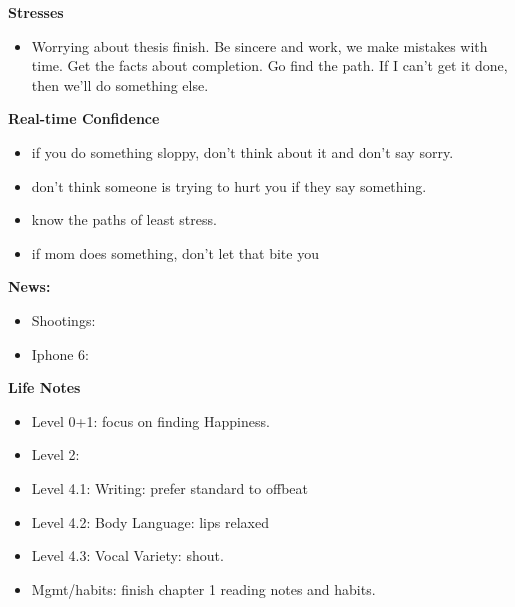 \documentclass[11pt]{article}
\begin{document}
{\textbf{Stresses}\\
\begin{itemize}
  \tiny \item \tiny Worrying about thesis finish. Be sincere and work, we
  make mistakes with time. Get the facts about completion.  Go
  find the path. If I can't get it done, then we'll do something
  else.
\end{itemize}

  \textbf{Real-time Confidence}\\
  \begin{itemize}
    \tiny \item \tiny if you do something sloppy, don't think about it and don't say sorry.
  \item \tiny don't think someone is trying to hurt you if they say something.
  \item \tiny know the paths of least stress.
  \item \tiny if mom does something, don't let that bite you
  \end{itemize}
  
  \textbf{News:} 
  \begin{itemize}
  \item \tiny Shootings: 
  \item \tiny Iphone 6: 
  \end{itemize} 

  \textbf{Life Notes}
  \begin{itemize}
    \tiny \item \tiny Level 0+1: focus on finding Happiness.
    \item \tiny Level 2:
    \item \tiny Level 4.1: Writing: prefer standard to offbeat
    \item \tiny Level 4.2: Body Language: lips relaxed
    \item \tiny Level 4.3: Vocal Variety: shout.
    \item \tiny Mgmt/habits: finish chapter 1 reading notes and habits.
  \end{itemize} 

}
\end{document}
